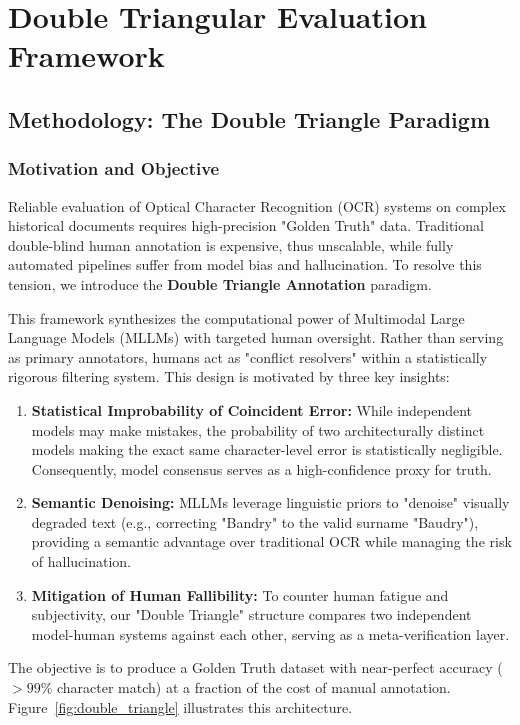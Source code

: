 \chapter{Double Triangular Evaluation Framework}

\section{Methodology: The Double Triangle Paradigm}

\subsection{Motivation and Objective}

Reliable evaluation of Optical Character Recognition (OCR) systems on complex historical documents requires high-precision "Golden Truth" data. Traditional double-blind human annotation is expensive, thus unscalable, while fully automated pipelines suffer from model bias and hallucination. To resolve this tension, we introduce the \textbf{Double Triangle Annotation} paradigm.

This framework synthesizes the computational power of Multimodal Large Language Models (MLLMs) with targeted human oversight. Rather than serving as primary annotators, humans act as "conflict resolvers" within a statistically rigorous filtering system. This design is motivated by three key insights:

\begin{enumerate}
    \item \textbf{Statistical Improbability of Coincident Error:} While independent models may make mistakes, the probability of two architecturally distinct models making the exact same character-level error is statistically negligible. Consequently, model consensus serves as a high-confidence proxy for truth.
    \item \textbf{Semantic Denoising:} MLLMs leverage linguistic priors to "denoise" visually degraded text (e.g., correcting "Bandry" to the valid surname "Baudry"), providing a semantic advantage over traditional OCR while managing the risk of hallucination.
    \item \textbf{Mitigation of Human Fallibility:} To counter human fatigue and subjectivity, our "Double Triangle" structure compares two independent model-human systems against each other, serving as a meta-verification layer.
\end{enumerate}

The objective is to produce a Golden Truth dataset with near-perfect accuracy ($>99\%$ character match) at a fraction of the cost of manual annotation. Figure~\ref{fig:double_triangle} illustrates this architecture.

